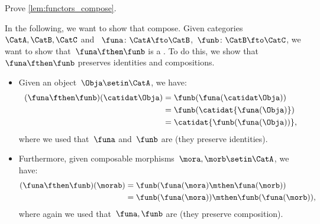 \begin{exercise}
    Prove \cref{lem:functors_compose}.
\end{exercise}
\begin{solution}
    In the following, we want to show that  compose.
    Given categories~$\CatA,\CatB,\CatC$ and ~$\funa\colon \CatA\fto \CatB$,~$\funb \colon \CatB\fto \CatC$, we want to show that~$\funa\fthen\funb$ is a .
    To do this, we show that~$\funa\fthen\funb$ preserves identities and compositions.
    \begin{itemize}
        \item Given an object~$\Obja\setin \CatA$, we have:
              \begin{equation}\label{eq:functor-comp-proof-1}
                  \begin{aligned}
                      (\funa\fthen\funb)(\catidat\Obja)
                       & =\funb(\funa(\catidat\Obja)) \\
                       & =\funb(\catidat{\funa(\Obja)}) \\
                       & =\catidat{\funb(\funa(\Obja))},
                  \end{aligned}
              \end{equation}
              where we used that~$\funa$ and~$\funb$ are  (they preserve identities).
        \item Furthermore, given composable morphisms~$\mora,\morb\setin \CatA$, we have:
              \begin{equation}\label{eq:functor-comp-proof-2}
                  \begin{aligned}
                      (\funa\fthen\funb)(\morab)
                       & =\funb(\funa(\mora)\mthen \funa(\morb)) \\
                       & =\funb(\funa(\mora))\mthen \funb(\funa(\morb)),
                  \end{aligned}
              \end{equation}
              where again we used that~$\funa,\funb$ are  (they preserve composition).
    \end{itemize}
\end{solution}


